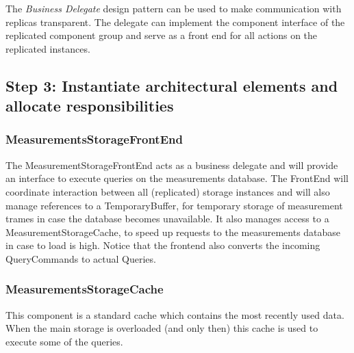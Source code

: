 \npar The \emph{Business Delegate} design pattern
\citep[see][p.~292]{Buschmann:07} can be used to make communication with
replicas transparent. The delegate can implement the component interface of the
replicated component group and serve as a front end for all actions on the
replicated instances.

\subsection{Step 3: Instantiate architectural elements and allocate responsibilities}
\label{add:it4/elements}


\subsubsection{MeasurementsStorageFrontEnd}

\npar The MeasurementStorageFrontEnd acts as a business delegate and will
provide an interface to execute queries on the measurements database. The
FrontEnd will coordinate interaction between all (replicated) storage instances
and will also manage references to a TemporaryBuffer, for temporary storage of
measurement trames in case the database becomes unavailable. It also manages
access to a MeasurementStorageCache, to speed up requests to the measurements
database in case to load is high. Notice that the frontend also converts the
incoming QueryCommands to actual Queries.

\subsubsection{MeasurementsStorageCache}

\npar This component is a standard cache which contains the most recently used
data. When the main storage is overloaded (and only then) this cache is used to
execute some of the queries. 

